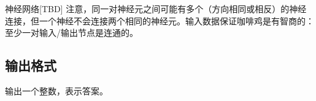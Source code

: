 \begin{Problem}{神经网络}{[TBD]}
注意，同一对神经元之间可能有多个（方向相同或相反）的神经连接，但一个神经不会连接两个相同的神经元。输入数据保证咖啡鸡是有智商的：至少一对输入/输出节点是连通的。

\subsection*{输出格式}

输出一个整数，表示答案。

\setcounter{ExampleNo}{0}


\end{Problem}
